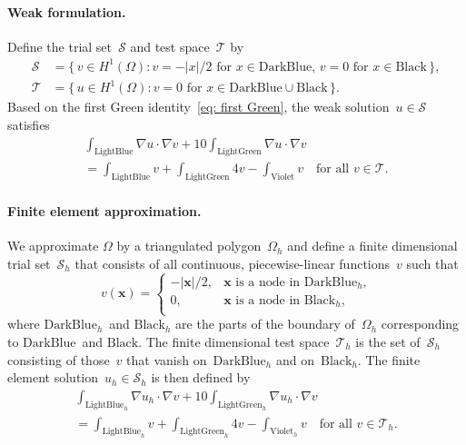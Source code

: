 \documentclass[a4paper,12pt]{article}
\begin{document}
\paragraph{Weak formulation.}
Define the trial set~$\mathcal{S}$ and test space~$\mathcal{T}$ by
\begin{align*}
\mathcal{S}&=\{\,v\in H^1(\Omega):
\text{$v=-|x|/2$ for $x\in\text{DarkBlue}$, $v=0$ for 
$x\in\text{Black}$}\,\},\\
\mathcal{T}&=\{\,u\in H^1(\Omega):
\text{$v=0$ for $x\in\text{DarkBlue}\cup\text{Black}$}\,\}.
\end{align*}
Based on the first Green identity~\eqref{eq: first Green}, the weak 
solution~$u\in\mathcal{S}$ satisfies
\begin{multline*}
\int_{\text{LightBlue}}\nabla u\cdot\nabla v
	+10\int_{\text{LightGreen}}\nabla u\cdot\nabla v\\
	=\int_{\text{LightBlue}}v+\int_{\text{LightGreen}}4v
	-\int_{\text{Violet}}v
\quad\text{for all $v\in\mathcal{T}$.}
\end{multline*}

\paragraph{Finite element approximation.} 
We approximate $\Omega$ by a triangulated polygon~$\Omega_h$ and 
define a finite dimensional trial set~$\mathcal{S}_h$ that consists 
of all continuous, piecewise-linear functions~$v$ such that 
\[
v(\boldsymbol{x})=\begin{cases}
-|\boldsymbol{x}|/2,&
\text{$\boldsymbol{x}$ is a node in~$\text{DarkBlue}_h$,}\\
0,&\text{$\boldsymbol{x}$ is a node in~$\text{Black}_h$,}\\
\end{cases}
\]
where $\text{DarkBlue}_h$~and $\text{Black}_h$ are the parts
of the boundary of~$\Omega_h$ corresponding to $\text{DarkBlue}$~and 
$\text{Black}$.  The finite dimensional test 
space~$\mathcal{T}_h$ is the set of~$\mathcal{S}_h$ consisting of 
those~$v$ that vanish on~$\text{DarkBlue}_h$ and
on~$\text{Black}_h$.  The finite element 
solution~$u_h\in\mathcal{S}_h$ is then defined by
\begin{multline*}
\int_{\text{LightBlue}_h}\nabla u_h\cdot\nabla v
	+10\int_{\text{LightGreen}_h}\nabla u_h\cdot\nabla v\\
	=\int_{\text{LightBlue}_h}v+\int_{\text{LightGreen}_h}4v
	-\int_{\text{Violet}_h}v
\quad\text{for all $v\in\mathcal{T}_h$.}
\end{multline*}
\end{document}
